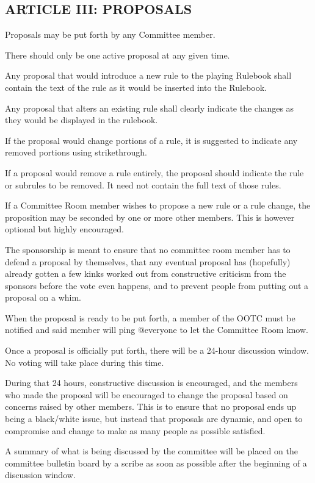 \subsection{ARTICLE III: PROPOSALS}
\begin{deepEnumerate}
    \item Proposals may be put forth by any Committee member.
    \item There should only be one active proposal at any given time.
    \item Any proposal that would introduce a new rule to the playing Rulebook shall contain the text of the rule as it would be inserted into the Rulebook.
    \item Any proposal that alters an existing rule shall clearly indicate the changes as they would be displayed in the rulebook.
    \begin{deepEnumerate}
        \item If the proposal would change portions of a rule, it is suggested to indicate any removed portions using strikethrough.
    \end{deepEnumerate}
    \item If a proposal would remove a rule entirely, the proposal should indicate the rule or subrules to be removed. It need not contain the full text of those rules.
    \item If a Committee Room member wishes to propose a new rule or a rule change, the proposition may be seconded by one or more other members.
    This is however optional but highly encouraged.
    \begin{deepEnumerate}
        \item The sponsorship is meant to ensure that no committee room member has to defend a proposal by themselves, that any eventual proposal has (hopefully) already gotten 
        a few kinks worked out from constructive criticism from the sponsors before the vote even happens, and to prevent people from putting out a proposal on a whim.
    \end{deepEnumerate}
    \item When the proposal is ready to be put forth, a member of the OOTC must be notified and said member will ping @everyone to let the Committee Room know.
    \item Once a proposal is officially put forth, there will be a 24-hour discussion window. No voting will take place during this time.
    \begin{deepEnumerate}
        \item During that 24 hours, constructive discussion is encouraged, and the members who made the proposal will be encouraged to change the proposal based on concerns
        raised by other members. This is to ensure that no proposal ends up being a black/white issue, but instead that proposals are dynamic, and open to compromise 
        and change to make as many people as possible satisfied.
        \item A summary of what is being discussed by the committee will be placed on the committee bulletin board by a scribe as soon as possible 
        after the beginning of a discussion window.
    \end{deepEnumerate}
\end{deepEnumerate}

